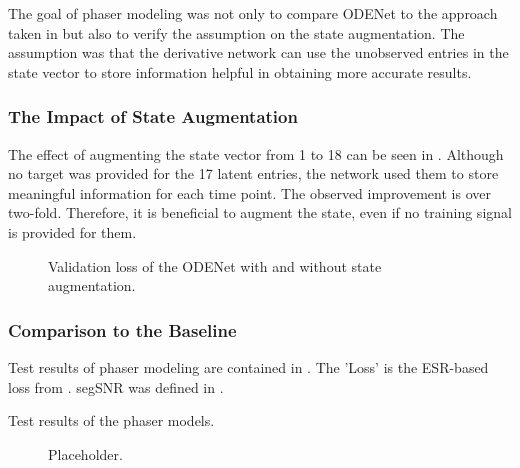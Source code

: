 The goal of phaser modeling was not only to compare ODENet to the approach taken in \cite{Wright2020} but also to verify the assumption on the state augmentation. The assumption was that the derivative network can use the unobserved entries in the state vector to store information helpful in obtaining more accurate results.

\subsubsection{The Impact of State Augmentation}
The effect of augmenting the state vector from 1 to 18 can be seen in . Although no target was provided for the 17 latent entries, the network used them to store meaningful information for each time point. The observed improvement is over two-fold. Therefore, it is beneficial to augment the state, even if no training signal is provided for them.

\begin{figure}
    \centering
    
    \caption{Validation loss of the ODENet with and without state augmentation.}
    \label{fig:state_augmentation}
\end{figure}

\subsubsection{Comparison to the Baseline}

Test results of phaser modeling are contained in . The 'Loss' is the \ac{ESR}-based loss from . \ac{segSNR} was defined in . %

\begin{table}[]
    \caption{Test results of the phaser models.}
    \centering
    
    \label{tab:phaser_results}
\end{table}

\begin{figure}
    \centering
    
    \caption{Placeholder.}
    \label{fig:phaser_lstm_vs_fe}
\end{figure}


